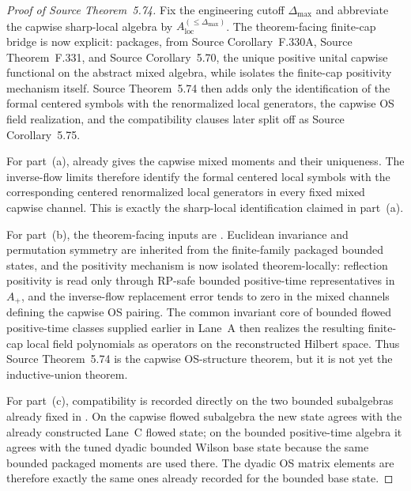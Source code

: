 \begin{proof}[Proof of Source Theorem~5.74]
Fix the engineering cutoff $\Delta_{\max}$ and abbreviate the capwise sharp-local algebra by $A_{\mathrm{loc}}^{(\le \Delta_{\max})}$. The theorem-facing finite-cap bridge is now explicit:  packages, from Source Corollary~F.330A, Source Theorem~F.331, and Source Corollary~5.70, the unique positive unital capwise functional on the abstract mixed algebra, while  isolates the finite-cap positivity mechanism itself. Source Theorem~5.74 then adds only the identification of the formal centered symbols with the renormalized local generators, the capwise OS field realization, and the compatibility clauses later split off as Source Corollary~5.75.

For part~(a),  already gives the capwise mixed moments and their uniqueness. The inverse-flow limits therefore identify the formal centered local symbols with the corresponding centered renormalized local generators in every fixed mixed capwise channel. This is exactly the sharp-local identification claimed in part~(a).

For part~(b), the theorem-facing inputs are . Euclidean invariance and permutation symmetry are inherited from the finite-family packaged bounded states, and the positivity mechanism is now isolated theorem-locally: reflection positivity is read only through RP-safe bounded positive-time representatives in $A_+$, and the inverse-flow replacement error tends to zero in the mixed channels defining the capwise OS pairing. The common invariant core of bounded flowed positive-time classes supplied earlier in Lane~A then realizes the resulting finite-cap local field polynomials as operators on the reconstructed Hilbert space. Thus Source Theorem~5.74 is the capwise OS-structure theorem, but it is not yet the inductive-union theorem.

For part~(c), compatibility is recorded directly on the two bounded subalgebras already fixed in . On the capwise flowed subalgebra the new state agrees with the already constructed Lane~C flowed state; on the bounded positive-time algebra it agrees with the tuned dyadic bounded Wilson base state because the same bounded packaged moments are used there. The dyadic OS matrix elements are therefore exactly the same ones already recorded for the bounded base state.
\end{proof}

